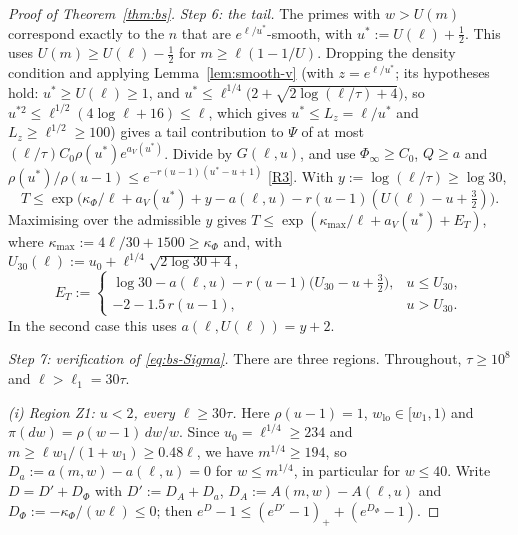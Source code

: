 \begin{proof}[Proof of Theorem~\ref{thm:bs}]
\emph{Step 6: the tail.} The primes with $w>U(m)$ correspond exactly to the $n$ that are $e^{\ell/u^*}$-smooth, with
$u^*:=U(\ell)+\frac12$. This uses $U(m)\ge U(\ell)-\frac12$ for $m\ge\ell(1-1/U)$. Dropping the density condition and
applying Lemma~\ref{lem:smooth-v} (with $z=e^{\ell/u^*}$; its hypotheses hold: $u^*\ge U(\ell)\ge1$, and
$u^*\le\ell^{1/4}\bigl(2+\sqrt{2\log(\ell/\tau)+4}\bigr)$, so $u^{*2}\le\ell^{1/2}(4\log\ell+16)\le\ell$, which gives $u^*\le L_z=\ell/u^*$
and $L_z\ge\ell^{1/2}\ge100$) gives a tail contribution to $\Psi$ of at most
$(\ell/\tau)C_0\rho(u^*)e^{a_V(u^*)}$.
Divide by $G(\ell,u)$, and use $\Phi_\infty\ge C_0$, $Q\ge a$ and
$\rho(u^*)/\rho(u-1)\le e^{-r(u-1)(u^*-u+1)}$ \ref{R3}. With $y:=\log(\ell/\tau)\ge\log30$,
\[
  T\le\exp\big(\kappa_\Phi/\ell+a_V(u^*)+y-a(\ell,u)-r(u-1)(U(\ell)-u+\tfrac32)\big).
\]
Maximising over the admissible $y$ gives $T\le\exp(\kappa_{\max}/\ell+a_V(u^*)+E_T)$, where
$\kappa_{\max}:=4\ell/30+1500\ge\kappa_\Phi$ and, with $U_{30}(\ell):=u_0+\ell^{1/4}\sqrt{2\log30+4}$,
\[
  E_T:=\begin{cases}\log30-a(\ell,u)-r(u-1)\big(U_{30}-u+\tfrac32\big),&u\le U_{30},\\
  -2-1.5\,r(u-1),&u>U_{30}.\end{cases}
\]
In the second case this uses $a(\ell,U(\ell))=y+2$.

\emph{Step 7: verification of \eqref{eq:bs-Sigma}.} There are three regions. Throughout, $\tau\ge10^8$ and $\ell>\ell_1=30\tau$.

\smallskip\noindent\emph{(i) Region Z1: $u<2$, every $\ell\ge30\tau$.} Here $\rho(u-1)=1$, $w_{\mathrm{lo}}\in[w_1,1)$ and
$\pi(dw)=\rho(w-1)\,dw/w$. Since $u_0=\ell^{1/4}\ge234$ and $m\ge\ell w_1/(1+w_1)\ge0.48\ell$, we have $m^{1/4}\ge194$, so
$D_a:=a(m,w)-a(\ell,u)=0$ for $w\le m^{1/4}$, in particular for $w\le40$. Write $D=D'+D_\Phi$ with $D':=D_A+D_a$,
$D_A:=A(m,w)-A(\ell,u)$ and $D_\Phi:=-\kappa_\Phi/(w\ell)\le0$; then $e^{D}-1\le(e^{D'}-1)_++(e^{D_\Phi}-1)$.


\end{proof}
